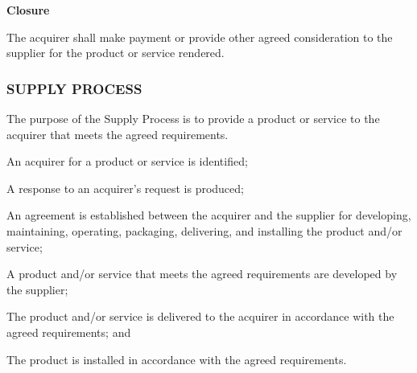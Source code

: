 \begin{adjustwidth}{2em}{0pt}
\begin{compactenum}
					\item {\bf Closure}
					\begin{compactenum}
						\item The acquirer shall make payment or provide other agreed consideration to the supplier for the product or service rendered.
					\end{compactenum}

				\end{compactenum}

			\end{adjustwidth}

		\newpage
		\subsubsection{SUPPLY PROCESS\label{proc:supply_process}}

			\begin{adjustwidth}{2em}{0pt}
				
				The purpose of the Supply Process is to provide a product or service to the acquirer that meets the agreed requirements.

			\end{adjustwidth}

			\begin{adjustwidth}{2em}{0pt}

				\begin{compactitem}

					\item An acquirer for a product or service is identified;

					\item A response to an acquirer's request is produced;

					\item An agreement is established between the acquirer and the supplier for developing, maintaining, operating, packaging, delivering, and installing the product and/or service;

					\item A product and/or service that meets the agreed requirements are developed by the supplier;

					\item The product and/or service is delivered to the acquirer in accordance with the agreed requirements; and

					\item The product is installed in accordance with the agreed requirements.

				\end{compactitem}

			\end{adjustwidth}

